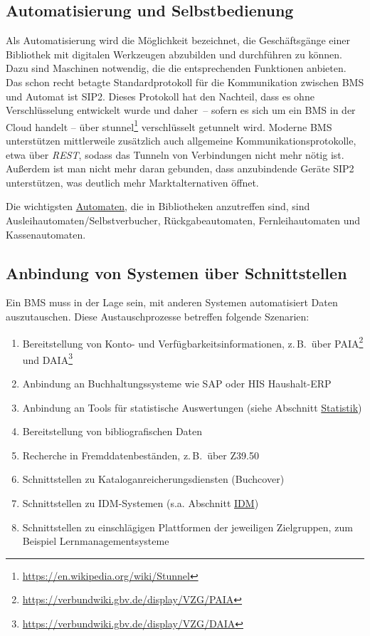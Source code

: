 \documentclass[
  11pt,
  letterpaper,
  DIV=11,
  twoside]{scrreprt}
\DeclareRobustCommand{\href}[2]{#2\footnote{\url{#1}}}
\begin{document}
\subsection{Automatisierung und
Selbstbedienung}\label{automatisierung-prozess}

Als Automatisierung wird die Möglichkeit bezeichnet, die Geschäftsgänge
einer Bibliothek mit digitalen Werkzeugen abzubilden und durchführen zu
können. Dazu sind Maschinen notwendig, die die entsprechenden Funktionen
anbieten. Das schon recht betagte Standardprotokoll für die
Kommunikation zwischen BMS und Automat ist {SIP2}. Dieses Protokoll hat
den Nachteil, dass es ohne Verschlüsselung entwickelt wurde und daher~--
sofern es sich um ein BMS in der Cloud handelt -- über
\href{https://en.wikipedia.org/wiki/Stunnel}{stunnel} verschlüsselt
getunnelt wird. Moderne BMS unterstützen mittlerweile zusätzlich auch
allgemeine Kommunikationsprotokolle, etwa über \emph{REST}, sodass das
Tunneln von Verbindungen nicht mehr nötig ist. Außerdem ist man nicht
mehr daran gebunden, dass anzubindende Geräte SIP2 unterstützen, was
deutlich mehr Marktalternativen öffnet.

Die wichtigsten \hyperref[automaten]{Automaten}, die in Bibliotheken
anzutreffen sind, sind Ausleihautomaten/Selbstverbucher,
Rückgabeautomaten, Fernleihautomaten und Kassenautomaten.

\subsection{Anbindung von Systemen über
Schnittstellen}\label{anbindung-von-systemen-uxfcber-schnittstellen}

Ein BMS muss in der Lage sein, mit anderen Systemen automatisiert Daten
auszutauschen. Diese Austauschprozesse betreffen folgende Szenarien:

\begin{enumerate}
\def\labelenumi{\arabic{enumi}.}
\item
  Bereitstellung von Konto- und Verfügbarkeitsinformationen, z.\,B.~über
  \href{https://verbundwiki.gbv.de/display/VZG/PAIA}{PAIA} und
  \href{https://verbundwiki.gbv.de/display/VZG/DAIA}{DAIA}
\item
  Anbindung an Buchhaltungssysteme wie SAP oder HIS Haushalt-ERP
\item
  Anbindung an Tools für statistische Auswertungen (siehe Abschnitt
  \hyperref[statistik]{Statistik})
\item
  Bereitstellung von bibliografischen Daten
\item
  Recherche in Fremddatenbeständen, z.\,B.~über Z39.50
\item
  Schnittstellen zu Kataloganreicherungsdiensten (Buchcover)
\item
  Schnittstellen zu IDM-Systemen (s.a. Abschnitt
  \hyperref[identity-management]{IDM})
\item
  Schnittstellen zu einschlägigen Plattformen der jeweiligen
  Zielgruppen, zum Beispiel Lernmanagementsysteme
\end{enumerate}
\end{document}
